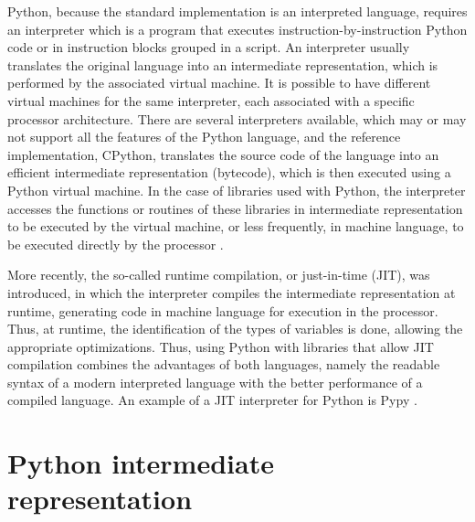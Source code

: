 Python, because the standard implementation is an interpreted language, requires an interpreter which is a program that executes instruction-by-instruction Python code or in instruction blocks grouped in a script. An interpreter usually translates the original language into an intermediate representation, which is performed by the associated virtual machine. It is possible to have different virtual machines for the same interpreter, each associated with a specific processor architecture. There are several interpreters available, which may or may not support all the features of the Python language, and the reference implementation, CPython, translates the source code of the language into an efficient intermediate representation (bytecode), which is then executed using a Python virtual machine. In the case of libraries used with Python, the interpreter accesses the functions or routines of these libraries in intermediate representation to be executed by the virtual machine, or less frequently, in machine language, to be executed directly by the processor \cite {Sanner1999}.

More recently, the so-called runtime compilation, or just-in-time (JIT), was introduced, in which the interpreter compiles the intermediate representation at runtime, generating code in machine language for execution in the processor. Thus, at runtime, the identification of the types of variables is done, allowing the appropriate optimizations. Thus, using Python with libraries that allow JIT compilation combines the advantages of both languages, namely the readable syntax of a modern interpreted language with the better performance of a compiled language. An example of a JIT interpreter for Python is Pypy \cite {Biham2006}.

%
%
%
\section{Python intermediate representation}

